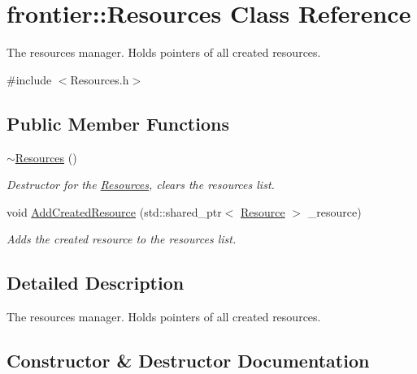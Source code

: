 \hypertarget{classfrontier_1_1_resources}{}\section{frontier\+:\+:Resources Class Reference}
\label{classfrontier_1_1_resources}


The resources manager. Holds pointers of all created resources.  




{\ttfamily \#include $<$Resources.\+h$>$}

\subsection*{Public Member Functions}
\begin{DoxyCompactItemize}
\item 
\hyperlink{classfrontier_1_1_resources_aa286a888a19e4ea5b5a94aa7ac1898b8}{$\sim$\+Resources} ()
\begin{DoxyCompactList}\small\item\em Destructor for the \hyperlink{classfrontier_1_1_resources}{Resources}, clears the resources list. \end{DoxyCompactList}\item 
void \hyperlink{classfrontier_1_1_resources_a34e0df1d6b935644bccee94ebe600a4a}{Add\+Created\+Resource} (std\+::shared\+\_\+ptr$<$ \hyperlink{classfrontier_1_1_resource}{Resource} $>$ \+\_\+resource)
\begin{DoxyCompactList}\small\item\em Adds the created resource to the resources list. \end{DoxyCompactList}\end{DoxyCompactItemize}


\subsection{Detailed Description}
The resources manager. Holds pointers of all created resources. 

\subsection{Constructor \& Destructor Documentation}
\mbox{\label{classfrontier_1_1_resources_aa286a888a19e4ea5b5a94aa7ac1898b8}} 
